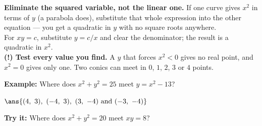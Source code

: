 \documentclass[12pt]{article}
\begin{document}
\begin{formulabox}
\textbf{Eliminate the squared variable, not the linear one.} If one curve
gives $x^2$ in terms of $y$ (a parabola does), substitute that whole
expression into the other equation --- you get a quadratic in $y$ with no
square roots anywhere.\\[3pt]
For $xy = c$, substitute $y = c/x$ and clear the denominator; the result is a
quadratic in $x^2$.\\[3pt]
\textbf{(!) Test every value you find.} A $y$ that forces $x^2 < 0$ gives no
real point, and $x^2 = 0$ gives only one. Two conics can meet in $0$, $1$, $2$,
$3$ or $4$ points.
\end{formulabox}
\begin{examplebox}
\textbf{Example:} Where does $x^2 + y^2 = 25$ meet $y = x^2 - 13$?
\par
$\ans{(4,\ 3),\ (-4,\ 3),\ (3,\ -4) \text{ and } (-3,\ -4)}$
\end{examplebox}
\begin{tryitbox}
\textbf{Try it:} Where does $x^2 + y^2 = 20$ meet $xy = 8$?\\[2pt]
\end{tryitbox}
\end{document}
